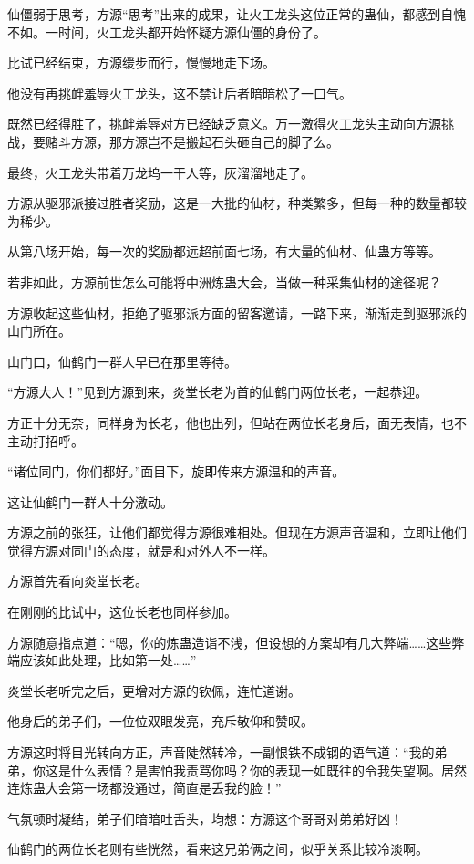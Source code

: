 \begin{this_body}
仙僵弱于思考，方源“思考”出来的成果，让火工龙头这位正常的蛊仙，都感到自愧不如。一时间，火工龙头都开始怀疑方源仙僵的身份了。

比试已经结束，方源缓步而行，慢慢地走下场。

他没有再挑衅羞辱火工龙头，这不禁让后者暗暗松了一口气。

既然已经得胜了，挑衅羞辱对方已经缺乏意义。万一激得火工龙头主动向方源挑战，要赌斗方源，那方源岂不是搬起石头砸自己的脚了么。

最终，火工龙头带着万龙坞一干人等，灰溜溜地走了。

方源从驱邪派接过胜者奖励，这是一大批的仙材，种类繁多，但每一种的数量都较为稀少。

从第八场开始，每一次的奖励都远超前面七场，有大量的仙材、仙蛊方等等。

若非如此，方源前世怎么可能将中洲炼蛊大会，当做一种采集仙材的途径呢？

方源收起这些仙材，拒绝了驱邪派方面的留客邀请，一路下来，渐渐走到驱邪派的山门所在。

山门口，仙鹤门一群人早已在那里等待。

“方源大人！”见到方源到来，炎堂长老为首的仙鹤门两位长老，一起恭迎。

方正十分无奈，同样身为长老，他也出列，但站在两位长老身后，面无表情，也不主动打招呼。

“诸位同门，你们都好。”面目下，旋即传来方源温和的声音。

这让仙鹤门一群人十分激动。

方源之前的张狂，让他们都觉得方源很难相处。但现在方源声音温和，立即让他们觉得方源对同门的态度，就是和对外人不一样。

方源首先看向炎堂长老。

在刚刚的比试中，这位长老也同样参加。

方源随意指点道：“嗯，你的炼蛊造诣不浅，但设想的方案却有几大弊端……这些弊端应该如此处理，比如第一处……”

炎堂长老听完之后，更增对方源的钦佩，连忙道谢。

他身后的弟子们，一位位双眼发亮，充斥敬仰和赞叹。

方源这时将目光转向方正，声音陡然转冷，一副恨铁不成钢的语气道：“我的弟弟，你这是什么表情？是害怕我责骂你吗？你的表现一如既往的令我失望啊。居然连炼蛊大会第一场都没通过，简直是丢我的脸！”

气氛顿时凝结，弟子们暗暗吐舌头，均想：方源这个哥哥对弟弟好凶！

仙鹤门的两位长老则有些恍然，看来这兄弟俩之间，似乎关系比较冷淡啊。


\end{this_body}
